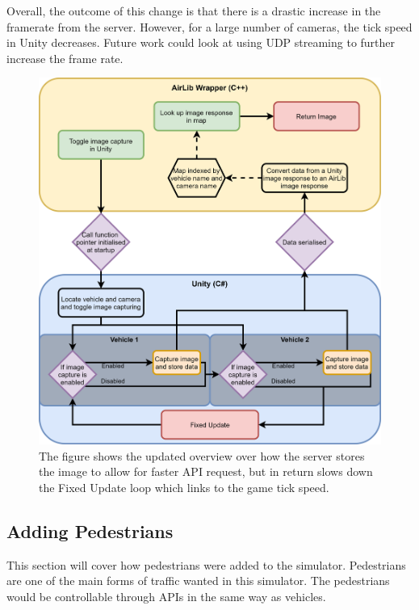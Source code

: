 Overall, the outcome of this change is that there is a drastic increase in the framerate from the server. However, for a large number of cameras, the tick speed in Unity decreases. Future work could look at using UDP streaming to further increase the frame rate.  

\begin{figure}[p]
    \centering
    \includegraphics[width=1.0\textwidth]{06_Implementation/00_AirSim/Diagrams/imagecaptureUpdated.png}
    \caption[Get images API Updated]{The figure shows the updated overview over how the server stores the image to allow for faster API request, but in return slows down the Fixed Update loop which links to the game tick speed.} \label{06:imageCaptureUpdated}
\end{figure}

\subsection{Adding Pedestrians}
This section will cover how pedestrians were added to the simulator. Pedestrians are one of the main forms of traffic wanted in this simulator. The pedestrians would be controllable through APIs in the same way as vehicles. 

